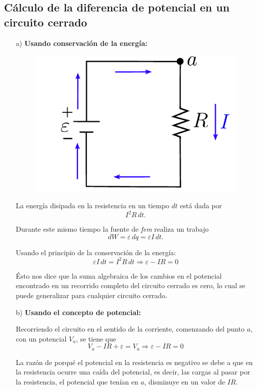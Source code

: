 \subsection*{Cálculo de la diferencia de potencial en un circuito cerrado}

\begin{itemize}
\item[a)] \textbf{Usando conservación de la energía:}

\begin{figure}[H]
    \centering
    \includegraphics[scale = 0.75]{Figuras/Circuito-Cerrado.pdf}
    \label{fig:Circuito-Cerrado}
\end{figure}

La energía disipada en la resistencia en un tiempo $dt$ está dada por
$$I^2R \,dt.$$

Durante este mismo tiempo la fuente de \textit{fem} realiza un trabajo
$$dW = \varepsilon \,dq = \varepsilon I \,dt.$$

Usando el principio de la conservación de la energía:
$$\varepsilon I \,dt = I^2 R \,dt 
 \Rightarrow \boxed{\varepsilon - IR = 0}$$

Ésto nos dice que la suma algebraica de los cambios en el potencial encontrado en un recorrido completo del circuito cerrado es cero, lo cual se puede generalizar para cualquier circuito cerrado.

\item[b)] \textbf{Usando el concepto de potencial:}

Recorriendo el circuito en el sentido de la corriente, comenzando del punto $a$, con un potencial $V_a$, se tiene que
$$V_a - IR + \varepsilon = V_a \Rightarrow \boxed{\varepsilon -IR = 0}$$

La razón de porqué el potencial en la resistencia es negativo se debe a que en la resistencia ocurre una caída del potencial, es decir, las cargas al pasar por la resistencia, el potencial que tenían en $a$, disminuye en un valor de $IR$.

\end{itemize}

